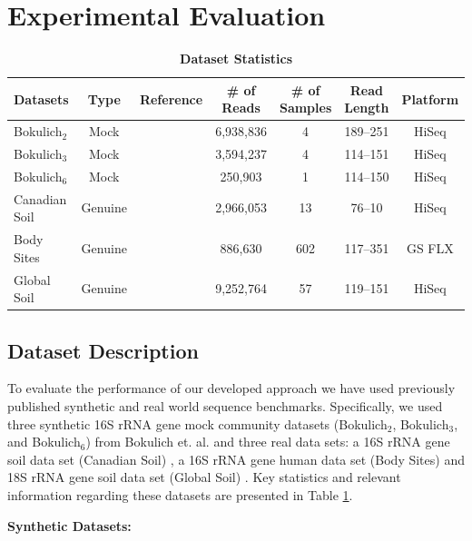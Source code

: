 \documentclass[10pt, conference, compsocconf]{IEEEtran}
\begin{document}
\section{Experimental Evaluation}
\begin{table}[tb] 
\centering 
\caption{\textbf{Dataset Statistics}} \label{table:finaltabledataset} 
\begin{tabular}{|l| c c c c c c|} 
\hline
\multicolumn{1}{|c|}{{\bf{Datasets}}} & \multicolumn{1}{c}{{\bf{Type}}} & {\bf{Reference}} & {\bf{\# of Reads}} & {\bf{\# of Samples}} & {\bf{Read Length}} & {\bf{Platform}}\\
\hline
{Bokulich$_2$} & Mock & \cite{MARmockDatasetRef} & 6,938,836 & 4 & 189--251 & HiSeq\\
{Bokulich$_3$} & Mock & \cite{MARmockDatasetRef} & 3,594,237 & 4 & 114--151 & HiSeq\\
{Bokulich$_6$} & Mock & \cite{MARmockDatasetRef} & 250,903 & 1 & 114--150 & HiSeq\\
{Canadian Soil} & Genuine & \cite{MARcanadianSoil} & 2,966,053 & 13 & 76--10 & HiSeq\\
{Body Sites} & Genuine & \cite{MARbodySites} & 886,630 & 602 & 117--351 & GS FLX\\
{Global Soil} & Genuine & \cite{MARglobalSoil} & 9,252,764 & 57 & 119--151 & HiSeq\\
\hline
\end{tabular}
\end{table} 

\subsection{Dataset Description}


To evaluate the performance of our developed approach 
we have used previously published 
synthetic and real world
sequence benchmarks. 
%
Specifically, 
we used  three synthetic 16S rRNA gene mock 
community datasets (Bokulich$_2$, Bokulich$_3$, and Bokulich$_6$) 
from Bokulich et. al. \cite{MARmockDatasetRef} and 
three 
real data sets: a 16S rRNA gene soil 
data set (Canadian Soil) \cite{MARcanadianSoil}, a 16S rRNA gene 
human data set (Body Sites) \cite{MARbodySites} and 
18S rRNA gene soil data set (Global Soil) \cite{MARglobalSoil}. 
Key statistics and relevant 
information regarding these datasets are presented
in Table \ref{table:finaltabledataset}. 

\textbf{Synthetic Datasets:}
\end{document}
